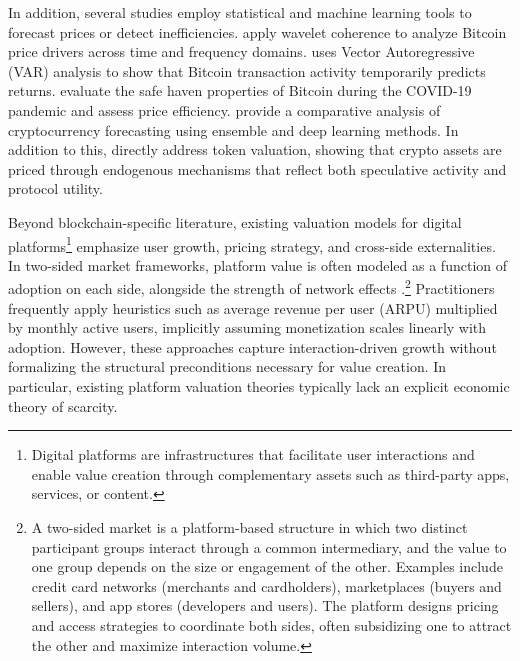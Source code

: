 \documentclass[12pt]{article}
\begin{document}
In addition, several studies employ statistical and machine learning tools to forecast prices or detect inefficiencies. \citet{Kristoufek2015} apply wavelet coherence to analyze Bitcoin price drivers across time and frequency domains. \citet{Koutmos2018} uses Vector Autoregressive (VAR) analysis to show that Bitcoin transaction activity temporarily predicts returns. \citet{dinizmaganini2021bitcoin} evaluate the safe haven properties of Bitcoin during the COVID-19 pandemic and assess price efficiency. \citet{bouteska2024cryptocurrency} provide a comparative analysis of cryptocurrency forecasting using ensemble and deep learning methods. In addition to this, \citet{nadler2020fair} directly address token valuation, showing that crypto assets are priced through endogenous mechanisms that reflect both speculative activity and protocol utility.

Beyond blockchain-specific literature, existing valuation models for digital platforms\footnote{Digital platforms are infrastructures that facilitate user interactions and enable value creation through complementary assets such as third-party apps, services, or content.} emphasize user growth, pricing strategy, and cross-side externalities. In two-sided market frameworks, platform value is often modeled as a function of adoption on each side, alongside the strength of network effects \citep{rochet2003platform, evans2003platform, parker2016platform}.\footnote{A two-sided market is a platform-based structure in which two distinct participant groups interact through a common intermediary, and the value to one group depends on the size or engagement of the other. Examples include credit card networks (merchants and cardholders), marketplaces (buyers and sellers), and app stores (developers and users). The platform designs pricing and access strategies to coordinate both sides, often subsidizing one to attract the other and maximize interaction volume.} Practitioners frequently apply heuristics such as average revenue per user (ARPU) multiplied by monthly active users, implicitly assuming monetization scales linearly with adoption. However, these approaches capture interaction-driven growth without formalizing the structural preconditions necessary for value creation. In particular, existing platform valuation theories typically lack an explicit economic theory of scarcity.
\end{document}
